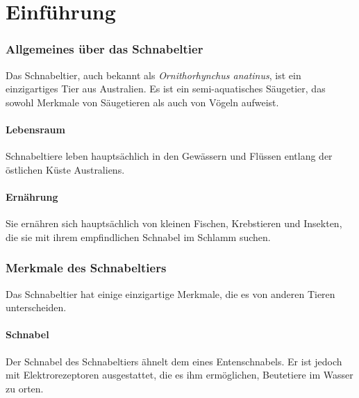 \documentclass{article}
\begin{document}
\part{Einführung}
    \section{Allgemeines über das Schnabeltier}
        Das Schnabeltier, auch bekannt als \textit{Ornithorhynchus anatinus}, ist ein einzigartiges Tier aus Australien. Es ist ein semi-aquatisches Säugetier, das sowohl Merkmale von Säugetieren als auch von Vögeln aufweist.

        \subsection{Lebensraum}
        Schnabeltiere leben hauptsächlich in den Gewässern und Flüssen entlang der östlichen Küste Australiens.

        \subsection{Ernährung}
        Sie ernähren sich hauptsächlich von kleinen Fischen, Krebstieren und Insekten, die sie mit ihrem empfindlichen Schnabel im Schlamm suchen.

    \section{Merkmale des Schnabeltiers}
        Das Schnabeltier hat einige einzigartige Merkmale, die es von anderen Tieren unterscheiden.

        \subsection{Schnabel}
        Der Schnabel des Schnabeltiers ähnelt dem eines Entenschnabels. Er ist jedoch mit Elektrorezeptoren ausgestattet, die es ihm ermöglichen, Beutetiere im Wasser zu orten.
\end{document}

